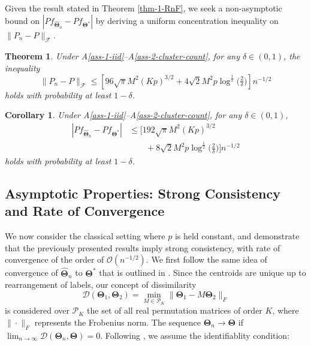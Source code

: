 \documentclass[12pt]{article}
\newcommand{\bTheta}{\boldsymbol{\Theta}}
\newcommand{\hth}{\widehat{\bTheta}_n}
\newtheorem{thm}{Theorem}[section]
\newtheorem{lemma}{Lemma}[section]
\newtheorem{cor}{Corollary}[section]
\begin{document}

Given the result stated in Theorem \ref{thm-1-RnF}, we seek a non-asymptotic bound on $|P f_{\widehat{\bm{\Theta}}_n}-Pf_{\bm{\Theta}^*}|$ by deriving a uniform concentration inequality on $\|P_n-P\|_{\mathcal{F}}$.

\begin{thm}\label{thm-2-diff-Pn-P}
    Under A\ref{ass-1-iid}--A\ref{ass-2-cluster-count}, for any $\delta\in(0,1)$, the inequality 
    \[\|P_n-P\|_\mathcal{F}\le \left[96\sqrt{\pi}M^2(Kp)^{3/2} + 4\sqrt{2} M^2p\log^{\frac{1}{2}}\big(\tfrac{2}{\delta}\big) \right] n^{-1/2}\]
    holds with probability at least $1-\delta$.
\end{thm}


\begin{cor}
    Under A\ref{ass-1-iid}--A\ref{ass-2-cluster-count}, for any $\delta\in(0,1)$,%
    \begin{align*}
    |P f_{\widehat{\bm{\Theta}}_n}-Pf_{\bm{\Theta}^*}| &\le \Big[192\sqrt{\pi}M^2(Kp)^{3/2}\\
    &\qquad+ 8\sqrt{2} M^2p\log^{\frac{1}{2}}\big(\tfrac{2}{\delta}\big) \Big] n^{-1/2}
    \end{align*}
    holds with probability at least $1-\delta$.
\end{cor}


\subsection{Asymptotic Properties: Strong Consistency and Rate of Convergence}

We now consider the classical setting where $p$ is held constant, and demonstrate that the previously presented results imply strong consistency, with rate of convergence of the order of $\mathcal{O}(n^{-1/2})$. We first follow the same idea of convergence of $\hth$ to $\bTheta^\ast$ that is outlined in \cite{pollard1981strong}. Since the centroids are unique up to rearrangement of labels, our concept of dissimilarity
\[\mathcal{D}(\bTheta_1,\bTheta_2) = \min_{M \in \mathscr{P}_K} \|\bTheta_1 - M \bTheta_2\|_F \]
is considered over $\mathscr{P}_K$ the set of all real permutation matrices of order $K$, where $\|\cdot\|_F$ represents the
Frobenius norm. The sequence $\bTheta_n\to \bTheta$ if $\lim_{n\to \infty} \mathcal{D}(\bTheta_n,\bTheta)=0$. Following \cite{terada2014strong,chakraborty2020entropy}, we assume the identifiablity condition:
\end{document}
